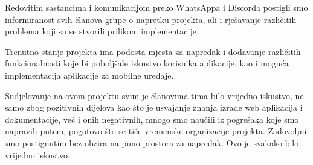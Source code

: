 		 
		 Redovitim sastancima i komunikacijom preko WhatsAppa i Discorda postigli smo informiranost svih članova grupe o napretku projekta, ali i rješavanje različitih problema koji su se stvorili prilikom implementacije.
		 
		 Trenutno stanje projekta ima podosta mjesta za napredak i dodavanje različitih funkcionalnosti koje bi poboljšale iskustvo korisnika aplikacije, kao i moguća implementacija aplikacije za mobilne uređaje.
		 
		 Sudjelovanje na ovom projektu svim je članovima tima bilo vrijedno iskustvo, ne samo zbog pozitivnih dijelova kao što je usvajanje znanja izrade web aplikacija i dokumentacije, već i onih negativnih, mnogo smo naučili iz pogrešaka koje smo napravili putem, pogotovo što se tiče vremenske organizacije projekta. Zadovoljni smo postignutim bez obzira na puno prostora za napredak. Ovo je svakako bilo vrijedno iskustvo.
		 
		 
		 
		 
		  
		 
		 
		
		\eject 